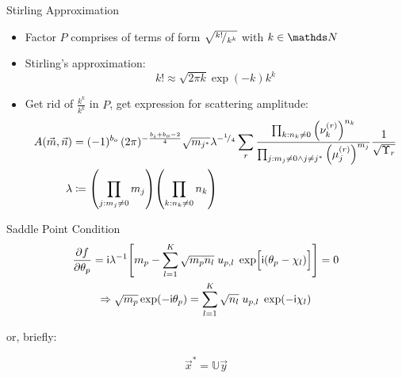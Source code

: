 
\begin{frame}{Stirling Approximation}
%
\begin{itemize}
\item Factor $P$ comprises of terms of form $\sqrt{{}^ {k!} \!/_ {k^k}}$ with $k \in \setNaturals$
\item Stirling's approximation:
	\begin{equation*}
		k! \approx \sqrt{2\pi k} \exp(-k) k^k
	\end{equation*}
\item Get rid of $\frac{k^k}{k^k}$ in $P$, get expression for scattering amplitude:
	\begin{align*}
		A(\vec{m}, \vec{n})
	&=
		(-1)^{b_o} \,	
		(2\pi)^{-\frac{b_i + b_o - 2}{4}}
		\sqrt{m_{j^*}}
		\lambda^{-{}^ {1} \!/_ {4}}
		\sum_{r}	
			\frac
				{\prod_{k : n_k \neq 0}                  \qty(\nu_k^{(r)})^{n_k}}
				{\prod_{j : m_j \neq 0 \land j \neq j^*} \qty(\mu_j^{(r)})^{m_j}}
			\frac{1}{\sqrt{\Upsilon_r}}
		\\
			\lambda
		&\coloneqq
			\qty( \prod_{j : m_j \neq 0} m_j )
			\qty( \prod_{k : n_k \neq 0} n_k )
	\end{align*}
\end{itemize}
%
\end{frame}


\begin{frame}{Saddle Point Condition}
%
\begin{gather*}
	\pdv{f}{\theta_p}
=
	\mathsf{i} \lambda^{-1}
	\qty[
		m_p
		-
		\sum_{l=1}^{K}
			\sqrt{m_p n_l} \; u_{p,l} \; \exp[ \Big. \mathsf{i}(\theta_p - \chi_l)]
	]
=
	0 \\
\Rightarrow
	\sqrt{m_p} \exp(-\mathsf{i} \theta_p)
=
	\sum_{l=1}^{K} \sqrt{n_l} \; u_{p,l} \; \exp(-\mathsf{i}\chi_l)
\end{gather*}
%
\vspace{6pt}
\begin{center}
	or, briefly:
\end{center}
\vspace{6pt}
%
\begin{equation*}
	\vec{x}^{*} = \mathbb{U} \vec{y}
\end{equation*}
%
\end{frame}

